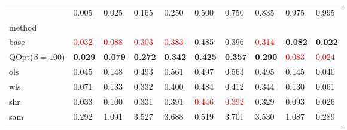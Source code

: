 \begin{tabular}{llllllllll}
\toprule
 & 0.005 & 0.025 & 0.165 & 0.250 & 0.500 & 0.750 & 0.835 & 0.975 & 0.995 \\
method &  &  &  &  &  &  &  &  &  \\
\midrule
base & \textcolor{red}{0.032} & \textcolor{red}{0.088} & \textcolor{red}{0.303} & \textcolor{red}{0.383} & 0.485 & 0.396 & \textcolor{red}{0.314} & \textbf{0.082} & \textbf{0.022} \\
\midrule
QOpt($\beta=100$) & \textbf{0.029} & \textbf{0.079} & \textbf{0.272} & \textbf{0.342} & \textbf{0.425} & \textbf{0.357} & \textbf{0.290} & \textcolor{red}{0.083} & \textcolor{red}{0.024} \\
ols & 0.045 & 0.148 & 0.493 & 0.561 & 0.497 & 0.563 & 0.495 & 0.145 & 0.040 \\
wls & 0.071 & 0.133 & 0.332 & 0.400 & 0.484 & 0.412 & 0.344 & 0.130 & 0.061 \\
shr & 0.033 & 0.100 & 0.331 & 0.391 & \textcolor{red}{0.446} & \textcolor{red}{0.392} & 0.329 & 0.093 & 0.026 \\
sam & 0.292 & 1.091 & 3.527 & 3.688 & 0.519 & 3.701 & 3.530 & 1.087 & 0.289 \\
\bottomrule
\end{tabular}